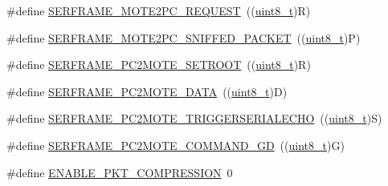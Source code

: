 \begin{DoxyCompactItemize}
\item 
\#define \hyperlink{group___open_serial_ga6fb55c17171dff6095228fa68069cd3e}{S\+E\+R\+F\+R\+A\+M\+E\+\_\+\+M\+O\+T\+E2\+P\+C\+\_\+\+R\+E\+Q\+U\+E\+ST}~((\hyperlink{_p_e___types_8h_aba7bc1797add20fe3efdf37ced1182c5}{uint8\+\_\+t})\textquotesingle{}R\textquotesingle{})
\item 
\#define \hyperlink{group___open_serial_ga6328feb8d4acbadd3c403522913ec6eb}{S\+E\+R\+F\+R\+A\+M\+E\+\_\+\+M\+O\+T\+E2\+P\+C\+\_\+\+S\+N\+I\+F\+F\+E\+D\+\_\+\+P\+A\+C\+K\+ET}~((\hyperlink{_p_e___types_8h_aba7bc1797add20fe3efdf37ced1182c5}{uint8\+\_\+t})\textquotesingle{}P\textquotesingle{})
\item 
\#define \hyperlink{group___open_serial_ga7d84c0666330f26f95d55f1747341b2a}{S\+E\+R\+F\+R\+A\+M\+E\+\_\+\+P\+C2\+M\+O\+T\+E\+\_\+\+S\+E\+T\+R\+O\+OT}~((\hyperlink{_p_e___types_8h_aba7bc1797add20fe3efdf37ced1182c5}{uint8\+\_\+t})\textquotesingle{}R\textquotesingle{})
\item 
\#define \hyperlink{group___open_serial_gafb648c9374f163a0fe504d132c2812bb}{S\+E\+R\+F\+R\+A\+M\+E\+\_\+\+P\+C2\+M\+O\+T\+E\+\_\+\+D\+A\+TA}~((\hyperlink{_p_e___types_8h_aba7bc1797add20fe3efdf37ced1182c5}{uint8\+\_\+t})\textquotesingle{}D\textquotesingle{})
\item 
\#define \hyperlink{group___open_serial_gac193711d797092c2e35f2ca3e7947b79}{S\+E\+R\+F\+R\+A\+M\+E\+\_\+\+P\+C2\+M\+O\+T\+E\+\_\+\+T\+R\+I\+G\+G\+E\+R\+S\+E\+R\+I\+A\+L\+E\+C\+HO}~((\hyperlink{_p_e___types_8h_aba7bc1797add20fe3efdf37ced1182c5}{uint8\+\_\+t})\textquotesingle{}S\textquotesingle{})
\item 
\#define \hyperlink{group___open_serial_ga2a7e44f17590c4c5562bc8df8b8240cc}{S\+E\+R\+F\+R\+A\+M\+E\+\_\+\+P\+C2\+M\+O\+T\+E\+\_\+\+C\+O\+M\+M\+A\+N\+D\+\_\+\+GD}~((\hyperlink{_p_e___types_8h_aba7bc1797add20fe3efdf37ced1182c5}{uint8\+\_\+t})\textquotesingle{}G\textquotesingle{})
\item 
\#define \hyperlink{group___open_serial_ga6499f570e793bb2111f482628e521a1b}{E\+N\+A\+B\+L\+E\+\_\+\+P\+K\+T\+\_\+\+C\+O\+M\+P\+R\+E\+S\+S\+I\+ON}~0
\end{DoxyCompactItemize}
